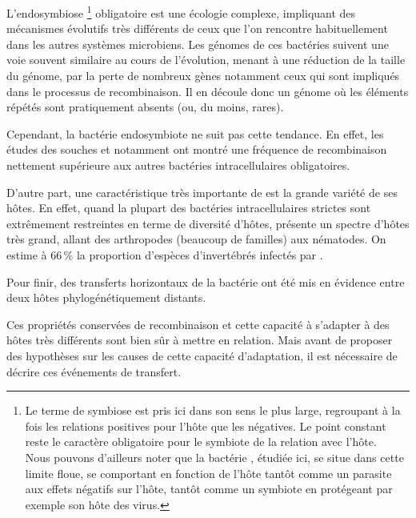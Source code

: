 L'endosymbiose%
\footnote{Le terme de symbiose est pris ici dans son sens le plus large, regroupant à la fois les relations positives pour l'hôte que les négatives. Le point constant reste le caractère obligatoire pour le symbiote de la relation avec l'hôte.\\
Nous pouvons d'ailleurs noter que la bactérie , étudiée ici, se situe dans cette limite floue, se comportant en fonction de l'hôte tantôt comme un parasite aux effets négatifs sur l'hôte\cite{Werren2008}, tantôt comme un symbiote en protégeant par exemple son hôte des virus.}
obligatoire est une écologie complexe, impliquant des mécanismes évolutifs très différents de ceux que l'on rencontre habituellement dans les autres systèmes microbiens.
Les génomes de ces bactéries suivent une voie souvent similaire au cours de l'évolution, menant à une réduction de la taille du génome, par la perte de nombreux gènes\cite{wernegreen2002} notamment ceux qui sont impliqués dans le processus de recombinaison.
Il en découle donc un génome où les éléments répétés sont pratiquement absents (ou, du moins, rares\cite{Bordenstein2005}).

Cependant, la bactérie endosymbiote  ne suit pas cette tendance. En effet, les études des souches  et  notamment ont montré une fréquence de recombinaison nettement supérieure aux autres bactéries intracellulaires obligatoires\cite{Wu2004}.

D'autre part, une caractéristique très importante de  est la grande variété de ses hôtes. 
En effet, quand la plupart des bactéries intracellulaires strictes sont extrêmement restreintes en terme de diversité d'hôtes,  présente un spectre d'hôtes très grand, allant des arthropodes (beaucoup de familles) aux nématodes. On estime à 66\,\% la proportion d'espèces d'invertébrés infectés par \cite{hilgenboecker2008}.

Pour finir, des transferts horizontaux de la bactérie ont été mis en évidence \cite{vavre1999} entre deux hôtes phylogénétiquement distants.

Ces propriétés conservées de recombinaison et cette capacité à s'adapter à des hôtes très différents sont bien sûr à mettre en relation.
Mais avant de proposer des hypothèses sur les causes de cette capacité d'adaptation, il est nécessaire de décrire ces événements de transfert.

